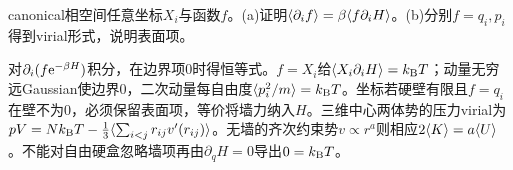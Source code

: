 \begin{exercise}[原题9(a)--(b)，选做]\label{p:333-4-9}
canonical相空间任意坐标$X_i$与函数$f$。(a)证明$\langle \partial_if\rangle=\beta\langle f\partial_iH\rangle$。(b)分别$f=q_i,p_i$得到virial形式，说明表面项。
\end{exercise}
\begin{solution}
对$\partial_i(f\mathrm e^{-\beta H})$积分，在边界项0时得恒等式。$f=X_i$给$\langle X_i\partial_iH\rangle=k_{\mathrm B} T$；动量无穷远Gaussian使边界0，二次动量每自由度$\langle p_i^2/m\rangle=k_{\mathrm B} T$。坐标若硬壁有限且$f=q_i$在壁不为0，必须保留表面项，等价将墙力纳入$H$。三维中心两体势的压力virial为$pV=Nk_{\mathrm B} T-\frac13\langle \sum_{i<j}r_{ij}v'(r_{ij})\rangle$。无墙的齐次约束势$v\propto r^a$则相应$2\langle K\rangle=a\langle U\rangle$。不能对自由硬盒忽略墙项再由$\partial_qH=0$导出$0=k_{\mathrm B} T$。
\end{solution}
